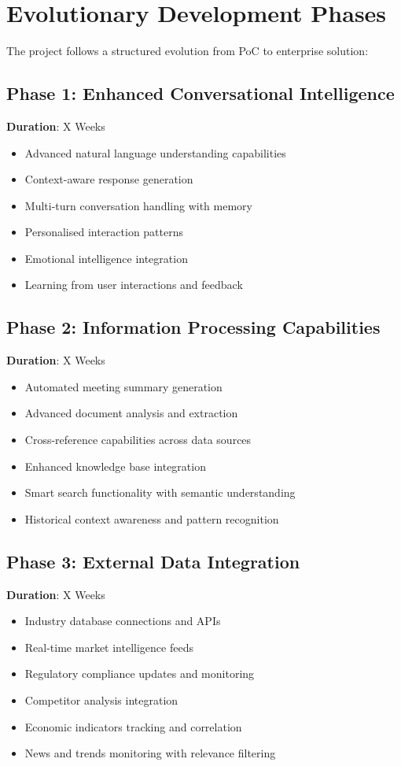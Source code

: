 \documentclass{article}
\begin{document}
\section{Evolutionary Development Phases}
The project follows a structured evolution from PoC to enterprise solution:

\subsection{Phase 1: Enhanced Conversational Intelligence}
\textbf{Duration}: X Weeks
\begin{itemize}
    \item Advanced natural language understanding capabilities
    \item Context-aware response generation
    \item Multi-turn conversation handling with memory
    \item Personalised interaction patterns
    \item Emotional intelligence integration
    \item Learning from user interactions and feedback
\end{itemize}

\subsection{Phase 2: Information Processing Capabilities}
\textbf{Duration}: X Weeks
\begin{itemize}
    \item Automated meeting summary generation
    \item Advanced document analysis and extraction
    \item Cross-reference capabilities across data sources
    \item Enhanced knowledge base integration
    \item Smart search functionality with semantic understanding
    \item Historical context awareness and pattern recognition
\end{itemize}

\subsection{Phase 3: External Data Integration}
\textbf{Duration}: X Weeks
\begin{itemize}
    \item Industry database connections and APIs
    \item Real-time market intelligence feeds
    \item Regulatory compliance updates and monitoring
    \item Competitor analysis integration
    \item Economic indicators tracking and correlation
    \item News and trends monitoring with relevance filtering
\end{itemize}
\end{document}
